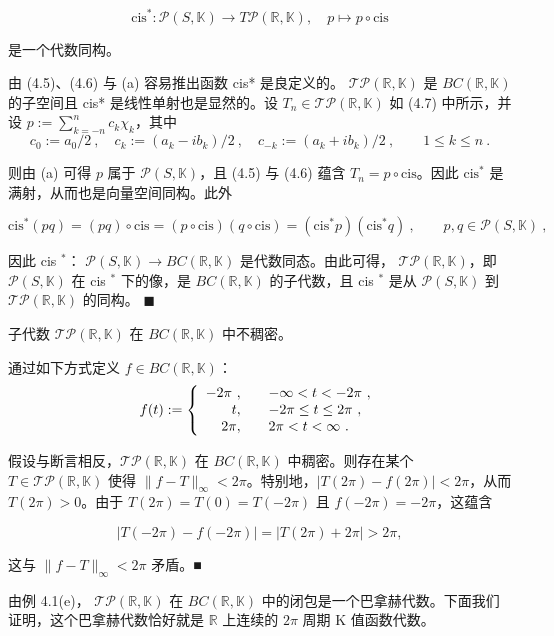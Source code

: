 \begin{remark}
\begin{items}
\[
\mathrm{c i s}^{*}:{\mathcal{P}}(S,{\mathbb{K}})\to T{\mathcal{P}}({\mathbb{R}},{\mathbb{K}}),\quad p\mapsto p\circ\mathrm{c i s}
\]

是一个代数同构。

\proofhead
由 (4.5)、(4.6) 与 (a) 容易推出函数 cis* 是良定义的。 $\mathcal{TP}(\mathbb{R}, \mathbb{K})$ 是  $BC(\mathbb{R}, \mathbb{K})$ 的子空间且 cis* 是线性单射也是显然的。设  $T_n \in \mathcal{TP}(\mathbb{R}, \mathbb{K})$ 如 (4.7) 中所示，并设  $p := \sum_{k=-n}^{n} c_k \chi_k$，其中
\begin{equation}
c_{0}:=a_{0}/2~,\quad c_{k}:=(a_{k}-i b_{k})/2~,\quad c_{-k}:=(a_{k}+i b_{k})/2~,\qquad1\leq k\leq n~.
\end{equation}

则由 (a) 可得 $p$ 属于 $\mathcal{P}(S,\mathbb{K})$，且 (4.5) 与 (4.6) 蕴含 $T_n = p \circ \mathrm{cis}$。因此 $\mathrm{cis}^*$ 是满射，从而也是向量空间同构。此外

\[
\mathrm{c i s}^{*}(p q)=(p q)\circ\mathrm{c i s}=(p\circ\mathrm{c i s})(q\circ\mathrm{c i s})=(\mathrm{c i s}^{*}p)(\mathrm{c i s}^{*}q)~,\qquad p,q\in\mathcal{P}(S,\mathbb{K})~,
\]

因此 cis $ ^{*} $： $\mathcal{P}(S,\mathbb{K}) \to BC(\mathbb{R},\mathbb{K})$ 是代数同态。由此可得， $\mathcal{TP}(\mathbb{R},\mathbb{K})$，即  $\mathcal{P}(S,\mathbb{K})$ 在 cis $ ^{*} $ 下的像，是  $BC(\mathbb{R},\mathbb{K})$ 的子代数，且 cis $ ^{*} $ 是从  $\mathcal{P}(S,\mathbb{K})$ 到  $\mathcal{TP}(\mathbb{R},\mathbb{K})$ 的同构。 $ \blacksquare $

\item

子代数  $\mathcal{TP}(\mathbb{R},\mathbb{K})$ 在  $BC(\mathbb{R},\mathbb{K})$ 中不稠密。

\proofhead
通过如下方式定义  $f \in BC(\mathbb{R}, \mathbb{K})$：
\begin{equation*}
f(t):=\left\{\begin{array}{r l}{-2\pi~,}&{\quad-\infty<t<-2\pi~,}\\ {t,}&{\quad-2\pi\leq t\leq2\pi~,}\\ {2\pi,}&{\quad2\pi<t<\infty~.}\end{array}\right.
\end{equation*}

假设与断言相反，$\mathcal{TP}(\mathbb{R},\mathbb{K})$ 在 $BC(\mathbb{R},\mathbb{K})$ 中稠密。则存在某个 $T\in\mathcal{TP}(\mathbb{R},\mathbb{K})$ 使得 $\|f-T\|_\infty<2\pi$。特别地，$|T(2\pi)-f(2\pi)|<2\pi$，从而 $T(2\pi)>0$。由于 $T(2\pi)=T(0)=T(-2\pi)$ 且 $f(-2\pi)=-2\pi$，这蕴含

\[
|T(-2\pi)-f(-2\pi)|=|T(2\pi)+2\pi|>2\pi,
\]

这与  $\|f - T\|_{\infty} < 2\pi$ 矛盾。■

\end{items}

由例 4.1(e)， $\mathcal{TP}(\mathbb{R},\mathbb{K})$ 在  $BC(\mathbb{R},\mathbb{K})$ 中的闭包是一个巴拿赫代数。下面我们证明，这个巴拿赫代数恰好就是  $\mathbb{R}$ 上连续的  $2\pi$ 周期 K 值函数代数。

\end{remark}


